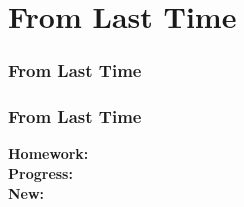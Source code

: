 \section{From Last Time}
\label{Section1_FromLastTime}

\begin{frame}
\frametitle{From Last Time}
\end{frame}

\begin{frame}
\frametitle{From Last Time}

\textbf{Homework:} \\
\textbf{Progress:} \\
\textbf{New:}
\end{frame}
